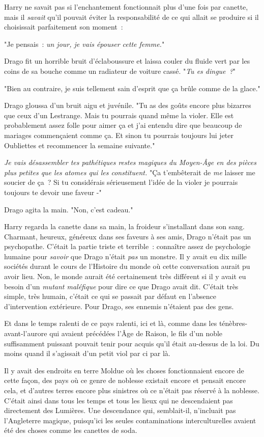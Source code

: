 Harry ne savait pas si l'enchantement fonctionnait plus d'une fois par canette, mais il \emph{savait} qu'il pouvait éviter la responsabilité de ce qui allait se produire si il choisissait parfaitement son moment~:

"Je pensais~: \emph{un jour, je vais épouser cette femme.}"

Drago fit un horrible bruit d'éclaboussure et laissa couler du fluide vert par les coins de sa bouche comme un radiateur de voiture cassé. "\emph{Tu es dingue~?}"

"Bien au contraire, je suis tellement sain d'esprit que ça brûle comme de la glace."

Drago gloussa d'un bruit aigu et juvénile. "Tu as des goûts encore plus bizarres que ceux d'un Lestrange. Mais tu pourrais quand même la violer. Elle est probablement assez folle pour aimer ça et j'ai entendu dire que beaucoup de mariages commençaient comme ça. Et sinon tu pourrais toujours lui jeter Oubliettes et recommencer la semaine suivante."

\emph{Je vais désassembler tes pathétiques restes magiques du Moyen-Âge en des pièces plus petites que les atomes qui les constituent.} "Ça t'embêterait de \emph{me} laisser me soucier de ça~? Si tu considérais sérieusement l'idée de la violer je pourrais toujours te devoir une faveur -"

Drago agita la main. "Non, c'est cadeau."

Harry regarda la canette dans sa main, la froideur s'installant dans son sang. Charmant, heureux, généreux dans ses faveurs à ses amis, Drago n'était pas un psychopathe. C'était la partie triste et terrible~: connaître assez de psychologie humaine pour \emph{savoir} que Drago n'était \emph{pas} un monstre. Il y avait eu dix mille sociétés durant le cours de l'Histoire du monde où cette conversation aurait pu avoir lieu. Non, le monde aurait été certainement très différent si il y avait eu besoin d'un \emph{mutant maléfique} pour dire ce que Drago avait dit. C'était très simple, très humain, c'était ce qui se passait par défaut en l'absence d'intervention extérieure. Pour Drago, ses ennemis n'étaient pas des gens.

Et dans le temps ralenti de ce pays ralenti, ici et là, comme dans les ténèbres-avant-l'aurore qui avaient précédées l'Âge de Raison, le fils d'un noble suffisamment puissant pouvait tenir pour acquis qu'il était au-dessus de la loi. Du moins quand il s'agissait d'un petit viol par ci par là.

Il y avait des endroits en terre Moldue où les choses fonctionnaient encore de cette façon, des pays où ce genre de noblesse existait encore et pensait encore cela, et d'autres terres encore plus sinistres où ce n'était pas réservé à la noblesse. C'était ainsi dans tous les temps et tous les lieux qui ne descendaient pas directement des Lumières. Une descendance qui, semblait-il, n'incluait pas l'Angleterre magique, puisqu'ici les seules contaminations interculturelles avaient été des choses comme les canettes de soda.

